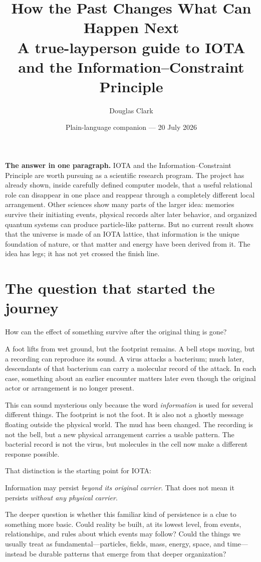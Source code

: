 \documentclass[11pt]{article}
\title{\vspace{-1.2em}\textbf{How the Past Changes What Can Happen Next}\\
\large A true-layperson guide to IOTA and the Information--Constraint Principle}
\author{Douglas Clark}
\date{Plain-language companion --- 20 July 2026}
\newcommand{\plainbox}[2]{%
  \begin{center}
  \colorbox{#1}{\parbox{0.92\linewidth}{\vspace{0.35em}#2\vspace{0.35em}}}
  \end{center}}
\begin{document}
\maketitle

\plainbox{icppale}{\small\textbf{The answer in one paragraph.}
IOTA and the Information--Constraint Principle are worth pursuing as a
scientific research program. The project has already shown, inside carefully
defined computer models, that a useful relational role can disappear in one
place and reappear through a completely different local arrangement. Other
sciences show many parts of the larger idea: memories survive their initiating
events, physical records alter later behavior, and organized quantum systems
can produce particle-like patterns. But no current result shows that the
universe is made of an IOTA lattice, that information is the unique foundation
of nature, or that matter and energy have been derived from it. The idea has
legs; it has not yet crossed the finish line.}

\section*{The question that started the journey}

How can the effect of something survive after the original thing is gone?

A foot lifts from wet ground, but the footprint remains. A bell stops moving,
but a recording can reproduce its sound. A virus attacks a bacterium; much
later, descendants of that bacterium can carry a molecular record of the
attack. In each case, something about an earlier encounter matters later even
though the original actor or arrangement is no longer present.

This can sound mysterious only because the word \emph{information} is used for
several different things. The footprint is not the foot. It is also not a
ghostly message floating outside the physical world. The mud has been changed.
The recording is not the bell, but a new physical arrangement carries a usable
pattern. The bacterial record is not the virus, but molecules in the cell now
make a different response possible.

That distinction is the starting point for IOTA:

\plainbox{icpwarm}{\small
Information may persist \emph{beyond its original carrier}. That does not mean
it persists \emph{without any physical carrier}.}

The deeper question is whether this familiar kind of persistence is a clue to
something more basic. Could reality be built, at its lowest level, from events,
relationships, and rules about which events may follow? Could the things we
usually treat as fundamental---particles, fields, mass, energy, space, and
time---instead be durable patterns that emerge from that deeper organization?
\end{document}
